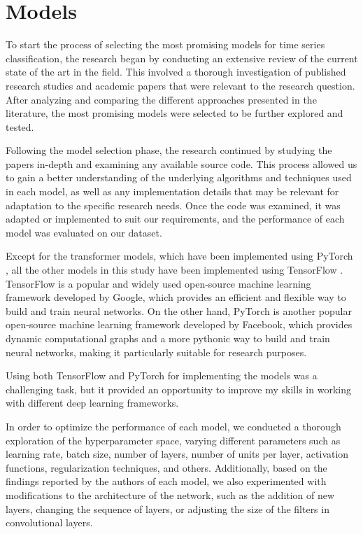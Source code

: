 \section{Models}
To start the process of selecting the most promising models for time series classification, the research began by conducting an extensive review of the current state of the art in the field. This involved a thorough investigation of published research studies and academic papers that were relevant to the research question. 
After analyzing and comparing the different approaches presented in the literature, the most promising models were selected to be further explored and tested.

Following the model selection phase, the research continued by studying the papers in-depth and examining any available source code.
This process allowed us to gain a better understanding of the underlying algorithms and techniques used in each model, as well as any implementation details that may be relevant for adaptation to the specific research needs.
Once the code was examined, it was adapted or implemented to suit our requirements, and the performance of each model was evaluated on our dataset.

Except for the transformer models, which have been implemented using PyTorch \cite{NEURIPS2019_9015}, all the other models in this study have been implemented using TensorFlow \cite{tensorflow2015-whitepaper}.
TensorFlow is a popular and widely used open-source machine learning framework developed by Google, which provides an efficient and flexible way to build and train neural networks.
On the other hand, PyTorch is another popular open-source machine learning framework developed by Facebook, which provides dynamic computational graphs and a more pythonic way to build and train neural networks, making it particularly suitable for research purposes.

Using both TensorFlow and PyTorch for implementing the models was a challenging task, but it provided an opportunity to improve my skills in working with different deep learning frameworks.

In order to optimize the performance of each model, we conducted a thorough exploration of the hyperparameter space, varying different parameters such as learning rate, batch size, number of layers, number of units per layer, activation functions, regularization techniques, and others.
Additionally, based on the findings reported by the authors of each model, we also experimented with modifications to the architecture of the network, such as the addition of new layers, changing the sequence of layers, or adjusting the size of the filters in convolutional layers.


